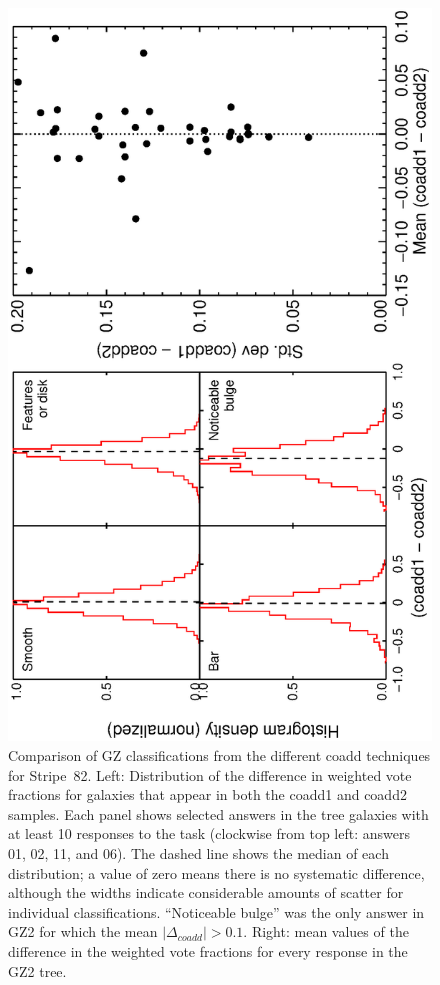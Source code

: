 \documentclass[useAMS,usenatbib]{mn2e}
\begin{document}
\begin{figure}
\includegraphics[angle=-90,width=7.0in]{figures/stripe82_coadd_compare.ps}
\caption{Comparison of GZ classifications from the different coadd techniques for Stripe~82. Left: Distribution of the difference in weighted vote fractions for galaxies that appear in both the coadd1 and coadd2 samples. Each panel shows selected answers in the tree galaxies with at least 10 responses to the task (clockwise from top left: answers 01, 02, 11, and 06). The dashed line shows the median of each distribution; a value of zero means there is no systematic difference, although the widths indicate considerable amounts of scatter for individual classifications. ``Noticeable bulge'' was the only answer in GZ2 for which the mean $|\Delta_{coadd}| > 0.1$. Right: mean values of the difference in the weighted vote fractions for every response in the GZ2 tree. 
\label{fig-stripe82_compare}}
\end{figure}
\end{document}
